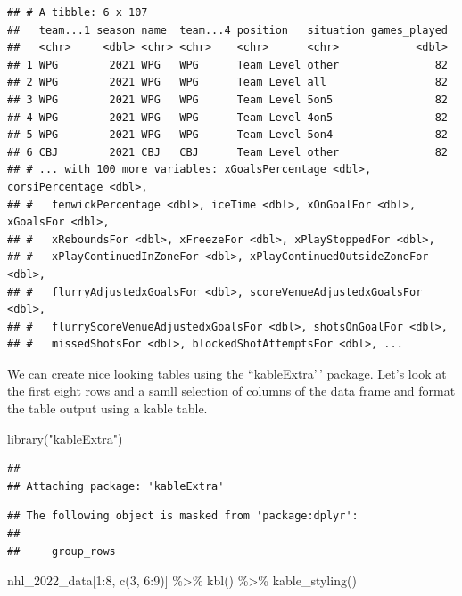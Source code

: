 \documentclass[
  11pt,
]{book}
\newenvironment{Shaded}{\begin{snugshade}}{\end{snugshade}}
\newcommand{\DecValTok}[1]{\textcolor[rgb]{0.00,0.00,0.81}{#1}}
\newcommand{\FunctionTok}[1]{\textcolor[rgb]{0.00,0.00,0.00}{#1}}
\newcommand{\NormalTok}[1]{#1}
\newcommand{\SpecialCharTok}[1]{\textcolor[rgb]{0.00,0.00,0.00}{#1}}
\newcommand{\StringTok}[1]{\textcolor[rgb]{0.31,0.60,0.02}{#1}}
\theoremstyle{definition}
\theoremstyle{definition}
\theoremstyle{definition}
\theoremstyle{definition}
\theoremstyle{remark}
\begin{document}
\begin{verbatim}
## # A tibble: 6 x 107
##   team...1 season name  team...4 position   situation games_played
##   <chr>     <dbl> <chr> <chr>    <chr>      <chr>            <dbl>
## 1 WPG        2021 WPG   WPG      Team Level other               82
## 2 WPG        2021 WPG   WPG      Team Level all                 82
## 3 WPG        2021 WPG   WPG      Team Level 5on5                82
## 4 WPG        2021 WPG   WPG      Team Level 4on5                82
## 5 WPG        2021 WPG   WPG      Team Level 5on4                82
## 6 CBJ        2021 CBJ   CBJ      Team Level other               82
## # ... with 100 more variables: xGoalsPercentage <dbl>, corsiPercentage <dbl>,
## #   fenwickPercentage <dbl>, iceTime <dbl>, xOnGoalFor <dbl>, xGoalsFor <dbl>,
## #   xReboundsFor <dbl>, xFreezeFor <dbl>, xPlayStoppedFor <dbl>,
## #   xPlayContinuedInZoneFor <dbl>, xPlayContinuedOutsideZoneFor <dbl>,
## #   flurryAdjustedxGoalsFor <dbl>, scoreVenueAdjustedxGoalsFor <dbl>,
## #   flurryScoreVenueAdjustedxGoalsFor <dbl>, shotsOnGoalFor <dbl>,
## #   missedShotsFor <dbl>, blockedShotAttemptsFor <dbl>, ...
\end{verbatim}

We can create nice looking tables using the ``kableExtra'\,' package. Let's look at the first eight rows and a samll selection of columns of the data frame and format the table output using a kable table.

\begin{Shaded}
\begin{Highlighting}[]
\FunctionTok{library}\NormalTok{(}\StringTok{"kableExtra"}\NormalTok{)}
\end{Highlighting}
\end{Shaded}

\begin{verbatim}
## 
## Attaching package: 'kableExtra'
\end{verbatim}

\begin{verbatim}
## The following object is masked from 'package:dplyr':
## 
##     group_rows
\end{verbatim}

\begin{Shaded}
\begin{Highlighting}[]
\NormalTok{nhl\_2022\_data[}\DecValTok{1}\SpecialCharTok{:}\DecValTok{8}\NormalTok{, }\FunctionTok{c}\NormalTok{(}\DecValTok{3}\NormalTok{, }\DecValTok{6}\SpecialCharTok{:}\DecValTok{9}\NormalTok{)] }\SpecialCharTok{\%\textgreater{}\%}
    \FunctionTok{kbl}\NormalTok{() }\SpecialCharTok{\%\textgreater{}\%}
    \FunctionTok{kable\_styling}\NormalTok{()}
\end{Highlighting}
\end{Shaded}
\end{document}
